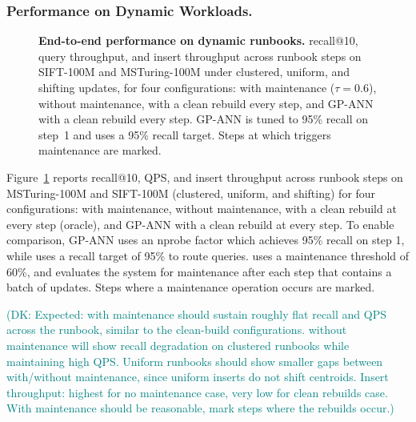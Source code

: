\documentclass[sigconf,review,anonymous]{acmart}
\newcommand{\dk}[1]{\textcolor{teal}{(DK: #1)}}
\begin{document}
\subsubsection{Performance on Dynamic Workloads.}
\begin{figure}
    \centering
    \caption{\textbf{End-to-end performance on dynamic runbooks.} recall@10, query throughput, and insert throughput across runbook steps on SIFT-100M and MSTuring-100M under clustered, uniform, and shifting updates, for four configurations: \SystemName{} with maintenance ($\tau=0.6$), \SystemName{} without maintenance, \SystemName{} with a clean rebuild every step, and GP-ANN with a clean rebuild every step. GP-ANN is tuned to 95\% recall on step~1 and \SystemName{} uses a 95\% recall target. Steps at which \SystemName{} triggers maintenance are marked. }
    \label{fig:perf-dynamic}
\end{figure}

Figure~\ref{fig:perf-dynamic} reports recall@10, QPS, and insert throughput across runbook steps on MSTuring-100M and SIFT-100M (clustered, uniform, and shifting) for four configurations: \SystemName{} with maintenance, \SystemName{} without maintenance, \SystemName{} with a clean rebuild at every step (oracle), and GP-ANN with a clean rebuild at every step. To enable comparison, GP-ANN uses an nprobe factor which achieves 95\% recall on step 1, while \SystemName{} uses a recall target of 95\% to route queries. \SystemName{} uses a maintenance threshold of 60\%, and evaluates the system for maintenance after each step that contains a batch of updates. Steps where a maintenance operation occurs are marked.

\dk{Expected: \SystemName{} with maintenance should sustain roughly flat recall and QPS across the runbook, similar to the clean-build configurations. \SystemName{} without maintenance will show recall degradation on clustered runbooks while maintaining high QPS. Uniform runbooks should show smaller gaps between with/without maintenance, since uniform inserts do not shift centroids. Insert throughput: highest for no maintenance case, very low for clean rebuilds case. With maintenance should be reasonable, mark steps where the rebuilds occur.}
\end{document}

